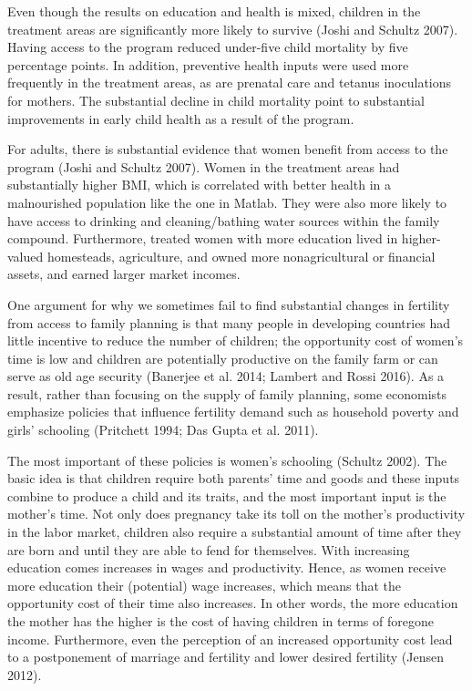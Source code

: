 \documentclass[]{article}
\begin{document}
Even though the results on education and health is mixed, children in the treatment areas are significantly more likely to survive (Joshi and Schultz 2007). Having access to the program reduced under-five child mortality by five percentage points. In addition, preventive health inputs were used more frequently in the treatment areas, as are prenatal care and tetanus inoculations for mothers. The substantial decline in child mortality point to substantial improvements in early child health as a result of the program.

For adults, there is substantial evidence that women benefit from access to the program (Joshi and Schultz 2007). Women in the treatment areas had substantially higher BMI, which is correlated with better health in a malnourished population like the one in Matlab. They were also more likely to have access to drinking and cleaning/bathing water sources within the family compound. Furthermore, treated women with more education lived in higher-valued homesteads, agriculture, and owned more nonagricultural or financial assets, and earned larger market incomes.

One argument for why we sometimes fail to find substantial changes in fertility from access to family planning is that many people in developing countries had little incentive to reduce the number of children; the opportunity cost of women's time is low and children are potentially productive on the family farm or can serve as old age security (Banerjee et al. 2014; Lambert and Rossi 2016). As a result, rather than focusing on the supply of family planning, some economists emphasize policies that influence fertility demand such as household poverty and girls' schooling (Pritchett 1994; Das Gupta et al. 2011).

The most important of these policies is women's schooling (Schultz 2002). The basic idea is that children require both parents' time and goods and these inputs combine to produce a child and its traits, and the most important input is the mother's time. Not only does pregnancy take its toll on the mother's productivity in the labor market, children also require a substantial amount of time after they are born and until they are able to fend for themselves. With increasing education comes increases in wages and productivity. Hence, as women receive more education their (potential) wage increases, which means that the opportunity cost of their time also increases. In other words, the more education the mother has the higher is the cost of having children in terms of foregone income. Furthermore, even the perception of an increased opportunity cost lead to a postponement of marriage and fertility and lower desired fertility (Jensen 2012).
\end{document}
